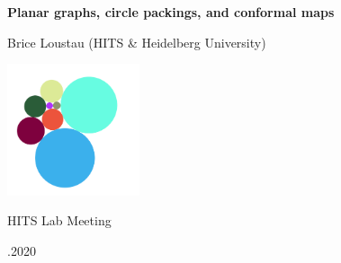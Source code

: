 \begin{frame}
\vspace{0.10\textheight}
\begin{center}
{\Large \bfseries Planar graphs, circle packings, and conformal maps}
  
\bigskip
{\large Brice Loustau (HITS \& Heidelberg University)}


\bigskip

\centering
\includegraphics[width=110pt]{CP-r.png}

\bigskip

{HITS Lab Meeting}

.2020
\end{center}
\end{frame}
